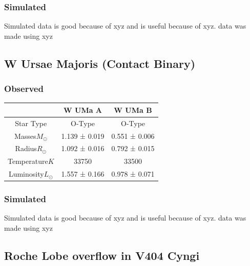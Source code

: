 \documentclass[12pt, letterpaper]{article}
\begin{document}
            
        \subsubsection{Simulated}
        Simulated data is good because of xyz and is useful because of xyz. data was made using xyz

    \subsection{\centering W Ursae Majoris (Contact Binary)}
        \subsubsection{Observed}
        
        \begin{center}
            \begin{tabular}{||c c c||} 
             \hline
             & W UMa A & W UMa B \\ 
             \hline\hline
             Star Type & O-Type \cite{Antokhina_2011} & O-Type \cite{Antokhina_2011} \\ 
             \hline
             Masses\(M_\odot\) & 1.139 ± 0.019\cite{10.1093/mnras/staa3753} & 0.551 ± 0.006\cite{10.1093/mnras/staa3753} \\
             \hline
             Radius\(R_\odot\) & 1.092 ± 0.016\cite{10.1093/mnras/staa3753} & 0.792 ± 0.015\cite{10.1093/mnras/staa3753} \\
             \hline
             Temperature$K$ & 33750 \cite{Antokhina_2011}  & 33500 \cite{Antokhina_2011} \\
             \hline
             Luminosity\(L_\odot\) & 1.557 ± 0.166\cite{10.1093/mnras/staa3753} & 0.978 ± 0.071\cite{10.1093/mnras/staa3753}   \\ 
             \hline
            \end{tabular}
        \end{center}
        
        \subsubsection{Simulated}
        Simulated data is good because of xyz and is useful because of xyz. data was made using xyz

    \subsection{\centering Roche Lobe overflow in V404 Cyngi}
\end{document}
